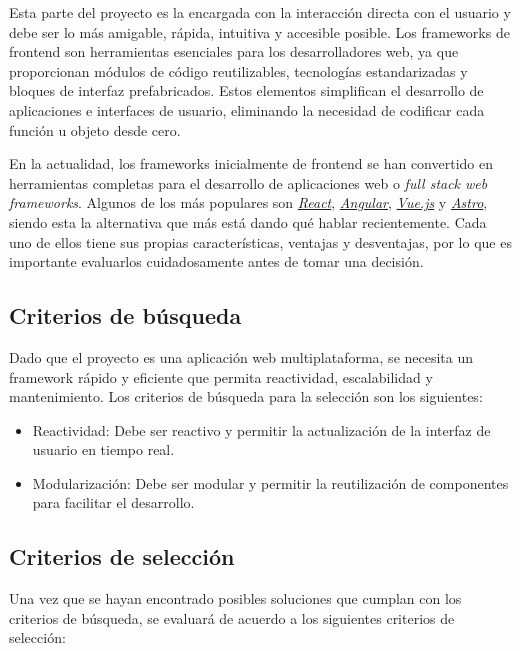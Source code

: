 Esta parte del proyecto es la encargada con la interacción directa con el usuario y debe ser lo más amigable, rápida, intuitiva y accesible posible. Los frameworks de frontend son herramientas esenciales para los desarrolladores web, ya que proporcionan módulos de código reutilizables, tecnologías estandarizadas y bloques de interfaz prefabricados. Estos elementos simplifican el desarrollo de aplicaciones e interfaces de usuario, eliminando la necesidad de codificar cada función u objeto desde cero.

En la actualidad, los frameworks inicialmente de frontend se han convertido en herramientas completas para el desarrollo de aplicaciones web o \textit{full stack web frameworks}. Algunos de los más populares son \textit{\href{https://es.react.dev/}{React}}, \textit{\href{https://angular.dev/}{Angular}}, \textit{\href{https://vuejs.org/}{Vue.js}} y \textit{\href{https://astro.build/}{Astro}}, siendo esta la alternativa que más está dando qué hablar recientemente. Cada uno de ellos tiene sus propias características, ventajas y desventajas, por lo que es importante evaluarlos cuidadosamente antes de tomar una decisión.

\subsection{Criterios de búsqueda}

Dado que el proyecto es una aplicación web multiplataforma, se necesita un framework rápido y eficiente que permita reactividad, escalabilidad y mantenimiento. Los criterios de búsqueda para la selección son los siguientes:

\begin{itemize}
    \item Reactividad: Debe ser reactivo y permitir la actualización de la interfaz de usuario en tiempo real.
    \item Modularización: Debe ser modular y permitir la reutilización de componentes para facilitar el desarrollo.
\end{itemize}

\subsection{Criterios de selección}

Una vez que se hayan encontrado posibles soluciones que cumplan con los criterios de búsqueda, se evaluará de acuerdo a los siguientes criterios de selección:

